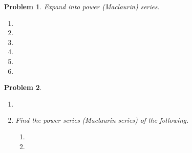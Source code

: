 \documentclass{article}
\renewcommand{\fcProblemRef}{\theproblem.\theenumi}
\newtheorem{problem}{Problem}
\begin{document}
\begin{problem}
Expand into power (Maclaurin) series.
\begin{multicols}{2}
\begin{enumerate}[ref={\fcProblemRef}]
\item 
\item 
\item 
\item 
\item 
\item 


\end{enumerate}
\end{multicols}
\end{problem}




\newpage
\begin{problem} ~
\begin{enumerate}
\item 
\item Find the power series (Maclaurin series) of the following.
\begin{enumerate}
\item 
\item 
\end{enumerate}
\end{enumerate}
\end{problem}

\end{document}
